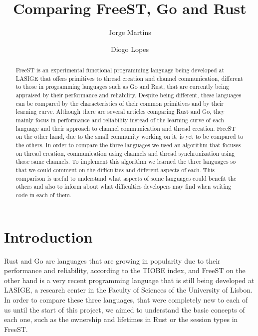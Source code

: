 \documentclass[runningheads]{llncs}
\begin{document}
\title{Comparing FreeST, Go and Rust}
\author{Jorge Martins \and
Diogo Lopes
}
\nocite{*}
\maketitle
\thispagestyle{empty}
\begin{abstract}
FreeST is an experimental functional programming language being developed at LASIGE that offers primitives to thread creation and channel communication, different to those in programming languages such as Go and Rust, that are currently being appraised by their performance and reliability. Despite being different, these languages can be compared by the characteristics of their common primitives and by their learning curve. Although there are several articles comparing Rust and Go, they mainly focus in performance and reliability instead of the learning curve of each language and their approach to channel communication and thread creation. FreeST on the other hand, due to the small community working on it, is yet to be compared to the others.
In order to compare the three languages we used an algorithm that focuses on thread creation, communication using channels and thread synchronization using those same channels. To implement this algorithm we learned the three languages so that we could comment on the difficulties and different aspects of each.
This comparison is useful to understand what aspects of some languages could benefit the others and also to inform about what difficulties developers may find when writing code in each of them.
\end{abstract}
\section{Introduction}
Rust and Go are languages that are growing in popularity due to their performance and reliability, according to the TIOBE index, and FreeST\cite{freest} on the other hand is a very recent programming language that is still being developed at LASIGE, a research center in the Faculty of Sciences of the University of Lisbon. 
In order to compare these three languages, that were completely new to each of us until the start of this project, we aimed to understand the basic concepts of each one, such as the ownership and lifetimes in Rust or the session types \cite{session} in FreeST.
\end{document}
